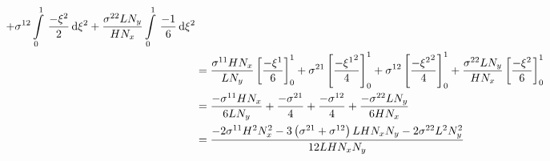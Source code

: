 \begin{equation}
\begin{aligned}
    +\conductivitytensorsymbol^{12}\gint{0}{1}{\dfrac{-\xitwo}{2}}{\xitwo}
    +\dfrac{\conductivitytensorsymbol^{22} L N_{y}}{H N_{x}}\gint{0}{1}{\dfrac{-1}{6}}{\xitwo} \\
    &=\dfrac{\conductivitytensorsymbol^{11} H N_{x}}{L N_{y}}\sqbrac{\dfrac{-\xione}{6}}^{1}_{0}
    +\conductivitytensorsymbol^{21}\sqbrac{\dfrac{-\xionesq}{4}}^{1}_{0}
    +\conductivitytensorsymbol^{12}\sqbrac{\dfrac{-\xitwosq}{4}}^{1}_{0}
    +\dfrac{\conductivitytensorsymbol^{22} L N_{y}}{H N_{x}}\sqbrac{\dfrac{-\xitwo}{6}}^{1}_{0} \\
    &=\dfrac{-\conductivitytensorsymbol^{11} H N_{x}}{6 L N_{y}}+\dfrac{-\conductivitytensorsymbol^{21}}{4}+
    \dfrac{-\conductivitytensorsymbol^{12}}{4}+\dfrac{-\conductivitytensorsymbol^{22} L N_{y}}{6 H N_{x}} \\
    &=\dfrac{-2\conductivitytensorsymbol^{11}H^{2}N_{x}^{2}-3\pbrac{\conductivitytensorsymbol^{21}+
        \conductivitytensorsymbol^{12}}L H N_{x} N_{y}-2\conductivitytensorsymbol^{22}L^{2}N_{y}^{2}}{12 L H N_{x} N_{y}}
  \end{aligned}
\end{equation}

